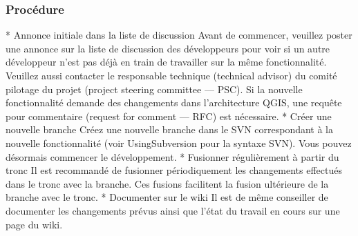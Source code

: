 \subsubsection{Proc\'edure}
 * Annonce initiale dans la liste de discussion
 Avant de commencer, veuillez poster une annonce sur la liste de discussion des d\'eveloppeurs pour voir si un autre d\'eveloppeur n'est pas d\'ej\`a en train de travailler sur la m\^eme fonctionnalit\'e. Veuillez aussi contacter le responsable technique (technical advisor) du comit\'e pilotage du projet (project steering committee --- PSC). Si la nouvelle fonctionnalit\'e demande des changements dans l'architecture QGIS, une requ\^ete pour commentaire (request for comment --- RFC) est n\'ecessaire.
 * Cr\'eer une nouvelle branche
Cr\'eez une nouvelle branche dans le SVN correspondant \`a la nouvelle fonctionnalit\'e (voir UsingSubversion pour la syntaxe SVN). Vous pouvez d\'esormais commencer le d\'eveloppement. 
 * Fusionner r\'eguli\`erement \`a partir du tronc
Il est recommand\'e de fusionner p\'eriodiquement les changements effectu\'es dans le tronc avec la branche. Ces fusions facilitent la fusion ult\'erieure de la branche avec le tronc.%
 * Documenter sur le wiki
Il est de m\^eme conseiller de documenter les changements pr\'evus ainsi que l'\'etat du travail en cours sur une page du wiki.
